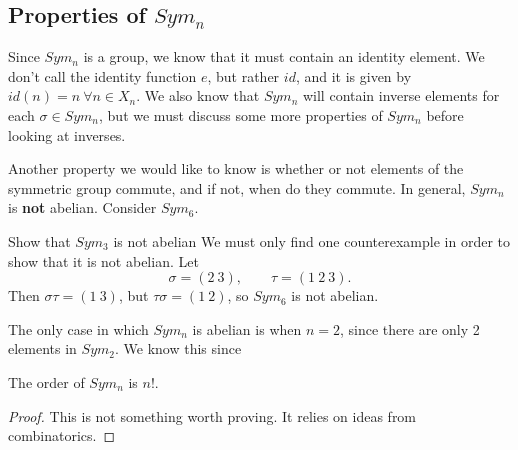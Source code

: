 \subsection*{Properties of $Sym_{n}$}

Since $Sym_{n}$ is a group, we know that it must contain an identity element. We don't call the identity function $e$, but rather $id$, and it is given by $id(n)=n\ \forall n\in X_{n}$. We also know that $Sym_{n}$ will contain inverse elements for each $\sigma\in Sym_{n}$, but we must discuss some more properties of $Sym_{n}$ before looking at inverses.

Another property we would like to know is whether or not elements of the symmetric group commute, and if not, when do they commute. In general, $Sym_{n}$ is \textbf{not} abelian. Consider $Sym_{6}$.
\begin{example}{Show that $Sym_{3}$ is not abelian}
	We must only find one counterexample in order to show that it is not abelian. Let
	\[
		\sigma=(2\ 3),\qquad\tau=(1\ 2\ 3).
	\]
	Then $\sigma\tau=(1\ 3)$, but $\tau\sigma=(1\ 2)$, so $Sym_{6}$ is not abelian.
\end{example}
The only case in which $Sym_{n}$ is abelian is when $n=2$, since there are only 2 elements in $Sym_{2}$. We know this since
\begin{theorem}{}
    The order of $Sym_{n}$ is $n!$.
\end{theorem}
\begin{proof}
    This is not something worth proving. It relies on ideas from combinatorics.
\end{proof}


